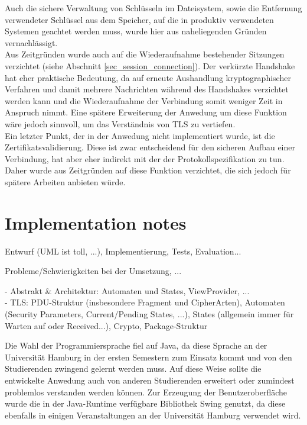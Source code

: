 Auch die sichere Verwaltung von Schlüsseln im Dateisystem, sowie die Entfernung verwendeter Schlüssel aus dem Speicher, auf die in produktiv verwendeten Systemen geachtet werden muss, wurde hier aus naheliegenden Gründen vernachlässigt.\\
Aus Zeitgründen wurde auch auf die Wiederaufnahme bestehender Sitzungen verzichtet (siehe Abschnitt \ref{sec_session_connection}). Der verkürzte Handshake hat eher praktische Bedeutung, da auf erneute Aushandlung kryptographischer Verfahren und damit mehrere Nachrichten während des Handshakes verzichtet werden kann und die Wiederaufnahme der Verbindung somit weniger Zeit in Anspruch nimmt. Eine spätere Erweiterung der Anwedung um diese Funktion wäre jedoch sinnvoll, um das Verständnis von TLS zu vertiefen.\\
Ein letzter Punkt, der in der Anwedung nicht implementiert wurde, ist die Zertifikatsvalidierung. Diese ist zwar entscheidend für den sicheren Aufbau einer Verbindung, hat aber eher indirekt mit der der Protokollspezifikation zu tun. Daher wurde aus Zeitgründen auf diese Funktion verzichtet, die sich jedoch für spätere Arbeiten anbieten würde.

\section{Implementation notes}

\begin{mdframed}
Entwurf (UML ist toll,  ...), Implementierung, Tests, Evaluation...

Probleme/Schwierigkeiten bei der Umsetzung, ...

- Abstrakt \& Architektur: Automaten und States, ViewProvider, ...\\
- TLS: PDU-Struktur (insbesondere Fragment und CipherArten), Automaten (Security Parameters, Current/Pending States, ...), States (allgemein immer für Warten auf oder Received...), Crypto, Package-Struktur
\end{mdframed}



Die Wahl der Programmiersprache fiel auf Java, da diese Sprache an der Universität Hamburg in der ersten Semestern zum Einsatz kommt und von den Studierenden zwingend gelernt werden muss. Auf diese Weise sollte die entwickelte Anwedung auch von anderen Studierenden erweitert oder zumindest problemlos verstanden werden können. Zur Erzeugung der Benutzeroberfläche wurde die in der Java-Runtime verfügbare Bibliothek Swing genutzt, da diese ebenfalls in einigen Veranstaltungen an der Universität Hamburg verwendet wird.

